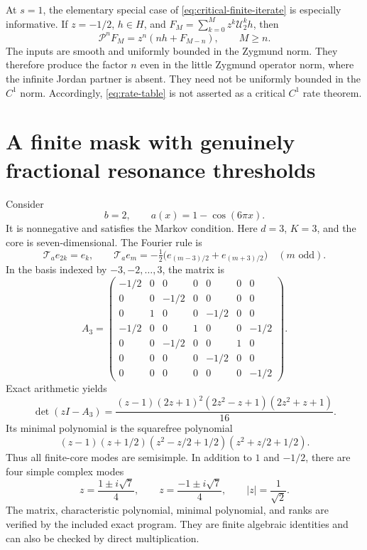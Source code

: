 \documentclass[11pt,a4paper]{article}
\numberwithin{equation}{section}
\theoremstyle{definition}
\theoremstyle{remark}
\newcommand{\Pp}{\mathcal P}
\newcommand{\Ta}{\mathcal T_a}
\begin{document}
At $s=1$, the elementary special case of
\eqref{eq:critical-finite-iterate} is especially informative. If
$z=-1/2$, $h\in H$, and $F_M=\sum_{k=0}^M z^k\mathcal U_2^kh$, then
\begin{equation}
 \Pp^nF_M=z^n(nh+F_{M-n}),\qquad M\ge n.
 \label{eq:sine-finite-iterate}
\end{equation}
The inputs are smooth and uniformly bounded in the Zygmund norm.
They therefore produce the factor $n$ even in the little Zygmund
operator norm, where the infinite Jordan partner is absent. They need
not be uniformly bounded in the $C^1$ norm. Accordingly,
\eqref{eq:rate-table} is not asserted as a critical $C^1$ rate theorem.

\section{A finite mask with genuinely fractional resonance thresholds}
\label{sec:example}

Consider
\begin{equation}
 b=2,\qquad a(x)=1-\cos(6\pi x).
 \label{eq:mask3}
\end{equation}
It is nonnegative and satisfies the Markov condition. Here $d=3$,
$K=3$, and the core is seven-dimensional. The Fourier rule is
\[
 \Ta e_{2k}=e_k,\qquad
 \Ta e_m=-\tfrac12\bigl(e_{(m-3)/2}+e_{(m+3)/2}\bigr)
 \quad(m\text{ odd}).
\]
In the basis indexed by $-3,-2,\ldots,3$, the matrix is
\begin{equation}
 A_3=\begin{pmatrix}
 -1/2&0&0&0&0&0&0\\
 0&0&-1/2&0&0&0&0\\
 0&1&0&0&-1/2&0&0\\
 -1/2&0&0&1&0&0&-1/2\\
 0&0&-1/2&0&0&1&0\\
 0&0&0&0&-1/2&0&0\\
 0&0&0&0&0&0&-1/2
 \end{pmatrix}.
 \label{eq:matrix3}
\end{equation}
Exact arithmetic yields
\begin{equation}
 \det(zI-A_3)=
 \frac{(z-1)(2z+1)^2(2z^2-z+1)(2z^2+z+1)}{16}.
 \label{eq:char3}
\end{equation}
Its minimal polynomial is the squarefree polynomial
\begin{equation}
 (z-1)(z+1/2)(z^2-z/2+1/2)(z^2+z/2+1/2).
 \label{eq:min3}
\end{equation}
Thus all finite-core modes are semisimple. In addition to $1$ and
$-1/2$, there are four simple complex modes
\begin{equation}
 z=\frac{1\pm i\sqrt7}{4},\qquad
 z=\frac{-1\pm i\sqrt7}{4},\qquad |z|=\frac1{\sqrt2}.
 \label{eq:complex-modes}
\end{equation}
The matrix, characteristic polynomial, minimal polynomial, and ranks
are verified by the included exact program. They are finite algebraic
identities and can also be checked by direct multiplication.
\end{document}
